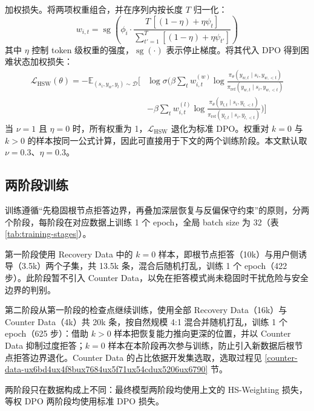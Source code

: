 \documentclass[fontset=fandol,type=master,campus=shenzhen,etitleauto=true]{hithesisbook}
\begin{document}
加权损失。将两项权重组合，并在序列内按长度 $T$ 归一化：
\begin{equation}
w_{i,t} = \operatorname{sg}\!\left( \phi_i \cdot \frac{T\,[(1 - \eta) + \eta \psi_t]}{\sum_{t'=1}^{T} [(1 - \eta) + \eta \psi_{t'}]} \right)
\end{equation}
其中 $\eta$ 控制 token 级权重的强度，$\operatorname{sg}(\cdot)$ 表示停止梯度。将其代入 DPO 得到困难状态加权损失：
\begin{equation}
\begin{aligned}
\mathcal{L}_{\text{HSW}}(\theta) = -\mathbb{E}_{(s_i,y_w,y_l)\sim\mathcal{D}}\Bigg[
&\log\sigma\Bigg(\beta\sum_{t}w_{i,t}^{(w)}\log\frac{\pi_\theta(y_{w,t}\mid s_i,y_{w,<t})}{\pi_{\text{ref}}(y_{w,t}\mid s_i,y_{w,<t})} \\
&-\beta\sum_{t}w_{i,t}^{(l)}\log\frac{\pi_\theta(y_{l,t}\mid s_i,y_{l,<t})}{\pi_{\text{ref}}(y_{l,t}\mid s_i,y_{l,<t})}\Bigg)\Bigg]
\end{aligned}
\end{equation}
当 $\nu = 1$ 且 $\eta = 0$ 时，所有权重为 1，$\mathcal{L}_{\text{HSW}}$ 退化为标准 DPO。权重对 $k = 0$ 与 $k > 0$ 的样本按同一公式计算，因此可直接用于下文的两个训练阶段。本文默认取 $\nu = 0.3$、$\eta = 0.3$。

\subsection{两阶段训练}\label{ux5206ux9636ux6bb5ux8badux7ec3ux7ec4ux7ec7}

训练遵循“先稳固根节点拒答边界，再叠加深层恢复与反偏保守约束”的原则，分两个阶段，每阶段在对应数据上训练 1 个 epoch，全局 batch size 为 32（表 \ref{tab:training-stages}）。

第一阶段使用 Recovery Data 中的 $k = 0$ 样本，即根节点拒答（10k）与用户侧诱导（3.5k）两个子集，共 13.5k 条，混合后随机打乱，训练 1 个 epoch（422 步）。此阶段暂不引入 Counter Data，以免在拒答模式尚未稳固时干扰危险与安全边界的判别。

第二阶段从第一阶段的检查点继续训练，使用全部 Recovery Data（16k）与 Counter Data（4k）共 20k 条，按自然规模 4:1 混合并随机打乱，训练 1 个 epoch（625 步）：借助 $k > 0$ 样本把恢复能力推向更深的位置，并以 Counter Data 抑制过度拒答；$k = 0$ 样本在本阶段再次参与训练，防止引入新数据后根节点拒答边界退化。Counter Data 的占比依据开发集选取，选取过程见 \ref{counter-data-ux6bd4ux4f8bux7684ux5f71ux54cdux5206ux6790} 节。

两阶段只在数据构成上不同：最终模型两阶段均使用上文的 HS-Weighting 损失，等权 DPO 两阶段均使用标准 DPO 损失。
\end{document}
